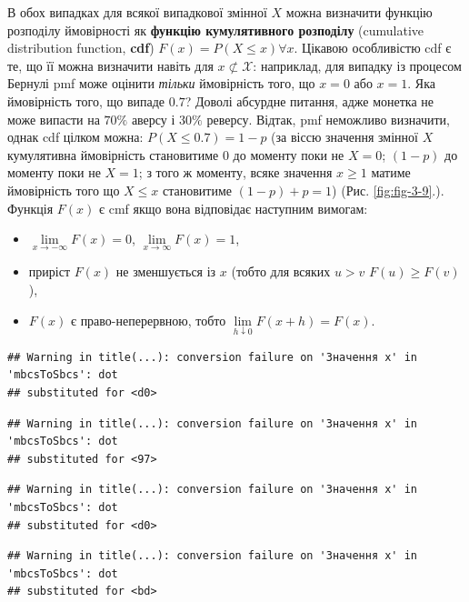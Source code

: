 \documentclass[
  11pt,
]{book}
\begin{document}
В обох випадках для всякої випадкової змінної \(X\) можна визначити функцію розподілу ймовірності як \textbf{функцію кумулятивного розподілу} (cumulative distribution function, \textbf{cdf}) \(F(x) = P(X \leq x) \forall x\). Цікавою особливістю cdf є те, що її можна визначити навіть для \(x \not\subset \mathcal{X}\): наприклад, для випадку із процесом Бернулі pmf може оцінити \emph{тільки} ймовірність того, що \(x = 0\) або \(x = 1\). Яка ймовірність того, що випаде \(0.7\)? Доволі абсурдне питання, адже монетка не може випасти на \(70\%\) аверсу і \(30\%\) реверсу. Відтак, pmf неможливо визначити, однак cdf цілком можна: \(P (X \leq 0.7) = 1-p\) (за віссю значення змінної \(X\) кумулятивна ймовірність становитиме \(0\) до моменту поки не \(X = 0\); \((1-p)\) до моменту поки не \(X = 1\); з того ж моменту, всяке значення \(x \geq 1\) матиме ймовірність того що \(X \leq x\) становитиме \((1 - p) + p = 1\)) (Рис. \ref{fig:fig-3-9}.). Функція \(F(x)\) є cmf якщо вона відповідає наступним вимогам:

\begin{itemize}
\item
  \(\lim \limits_{x \rightarrow - \infty} F(x) = 0\), \(\lim \limits_{x \rightarrow  \infty} F(x) = 1\),
\item
  приріст \(F(x)\) не зменшується із \(x\) (тобто для всяких \(u > v\) \(F(u) \geq F(v)\)),
\item
  \(F(x)\) є право-неперервною, тобто \(\lim \limits_{h \downarrow 0} F(x + h) = F(x)\).
\end{itemize}

\begin{verbatim}
## Warning in title(...): conversion failure on 'Значення x' in 'mbcsToSbcs': dot
## substituted for <d0>
\end{verbatim}

\begin{verbatim}
## Warning in title(...): conversion failure on 'Значення x' in 'mbcsToSbcs': dot
## substituted for <97>
\end{verbatim}

\begin{verbatim}
## Warning in title(...): conversion failure on 'Значення x' in 'mbcsToSbcs': dot
## substituted for <d0>
\end{verbatim}

\begin{verbatim}
## Warning in title(...): conversion failure on 'Значення x' in 'mbcsToSbcs': dot
## substituted for <bd>
\end{verbatim}
\end{document}
